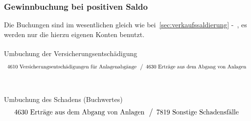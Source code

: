 \documentclass[a4paper,10pt]{report}
\begin{document}
\subsubsection{Gewinnbuchung bei positiven Saldo}
Die Buchungen sind im wesentlichen gleich wie
bei~\autoref{sec:verkaufssaldierung}
-~, es werden nur die hierzu eigenen
Konten benutzt.\\
\\
Umbuchung der Versicherungsentschädigung
\begin{equation*}
  \begin{array}{l}
    \text{4610 Versicherungsentschädigungen für Anlagenabgänge}\\
  \end{array}
  \left\slash
    \begin{array}{l}
      \text{4630 Erträge aus dem Abgang von Anlagen}\\
    \end{array}
  \right.
\end{equation*}\\
\\
Umbuchung des Schadens (Buchwertes)
\begin{equation*}
  \begin{array}{l}
    \text{4630 Erträge aus dem Abgang von Anlagen}\\
  \end{array}
  \left\slash
    \begin{array}{l}
      \text{7819 Sonstige Schadensfälle}\\
    \end{array}
  \right.
\end{equation*}
\end{document}

